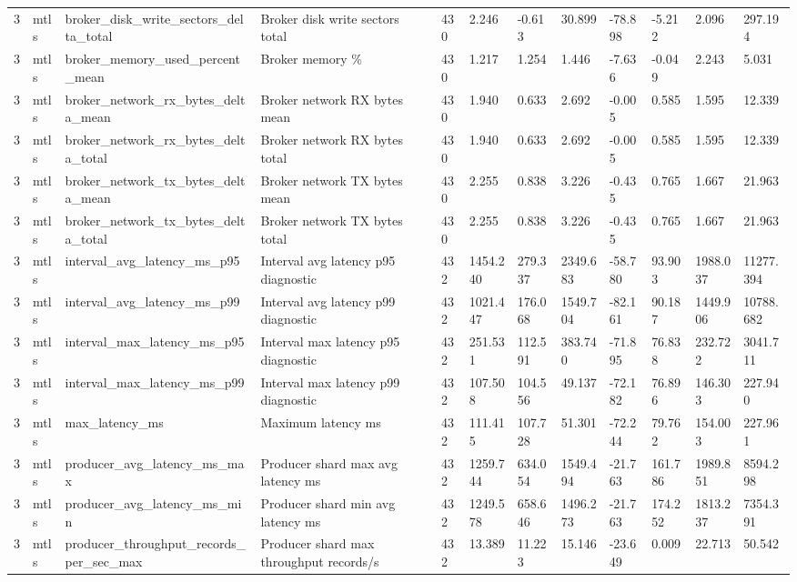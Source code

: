\begin{longtable}{llllllllllll}
3 & mtls & broker\_disk\_write\_sectors\_delta\_total & Broker disk write sectors total & 430 & 2.246 & -0.613 & 30.899 & -78.898 & -5.212 & 2.096 & 297.194 \\
3 & mtls & broker\_memory\_used\_percent\_mean & Broker memory \% & 430 & 1.217 & 1.254 & 1.446 & -7.636 & -0.049 & 2.243 & 5.031 \\
3 & mtls & broker\_network\_rx\_bytes\_delta\_mean & Broker network RX bytes mean & 430 & 1.940 & 0.633 & 2.692 & -0.005 & 0.585 & 1.595 & 12.339 \\
3 & mtls & broker\_network\_rx\_bytes\_delta\_total & Broker network RX bytes total & 430 & 1.940 & 0.633 & 2.692 & -0.005 & 0.585 & 1.595 & 12.339 \\
3 & mtls & broker\_network\_tx\_bytes\_delta\_mean & Broker network TX bytes mean & 430 & 2.255 & 0.838 & 3.226 & -0.435 & 0.765 & 1.667 & 21.963 \\
3 & mtls & broker\_network\_tx\_bytes\_delta\_total & Broker network TX bytes total & 430 & 2.255 & 0.838 & 3.226 & -0.435 & 0.765 & 1.667 & 21.963 \\
3 & mtls & interval\_avg\_latency\_ms\_p95 & Interval avg latency p95 diagnostic & 432 & 1454.240 & 279.337 & 2349.683 & -58.780 & 93.903 & 1988.037 & 11277.394 \\
3 & mtls & interval\_avg\_latency\_ms\_p99 & Interval avg latency p99 diagnostic & 432 & 1021.447 & 176.068 & 1549.704 & -82.161 & 90.187 & 1449.906 & 10788.682 \\
3 & mtls & interval\_max\_latency\_ms\_p95 & Interval max latency p95 diagnostic & 432 & 251.531 & 112.591 & 383.740 & -71.895 & 76.838 & 232.722 & 3041.711 \\
3 & mtls & interval\_max\_latency\_ms\_p99 & Interval max latency p99 diagnostic & 432 & 107.508 & 104.556 & 49.137 & -72.182 & 76.896 & 146.303 & 227.940 \\
3 & mtls & max\_latency\_ms & Maximum latency ms & 432 & 111.415 & 107.728 & 51.301 & -72.244 & 79.762 & 154.003 & 227.961 \\
3 & mtls & producer\_avg\_latency\_ms\_max & Producer shard max avg latency ms & 432 & 1259.744 & 634.054 & 1549.494 & -21.763 & 161.786 & 1989.851 & 8594.298 \\
3 & mtls & producer\_avg\_latency\_ms\_min & Producer shard min avg latency ms & 432 & 1249.578 & 658.646 & 1496.273 & -21.763 & 174.252 & 1813.237 & 7354.391 \\
3 & mtls & producer\_throughput\_records\_per\_sec\_max & Producer shard max throughput records/s & 432 & 13.389 & 11.223 & 15.146 & -23.649 & 0.009 & 22.713 & 50.542 \\

\end{longtable}

